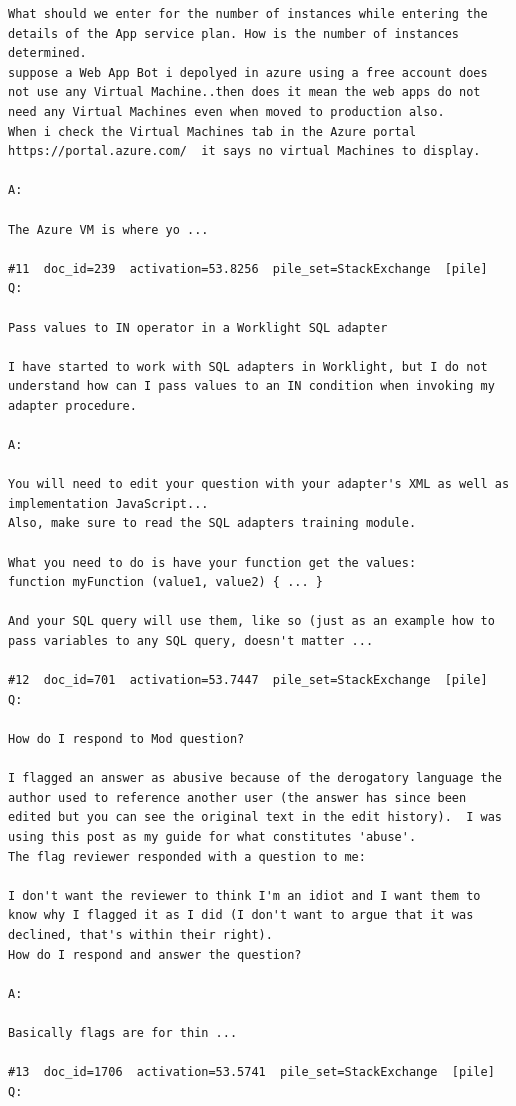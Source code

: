 \begin{verbatim}
What should we enter for the number of instances while entering the details of the App service plan. How is the number of instances determined.
suppose a Web App Bot i depolyed in azure using a free account does not use any Virtual Machine..then does it mean the web apps do not need any Virtual Machines even when moved to production also.
When i check the Virtual Machines tab in the Azure portal https://portal.azure.com/  it says no virtual Machines to display.

A:

The Azure VM is where yo ...

#11  doc_id=239  activation=53.8256  pile_set=StackExchange  [pile]
Q:

Pass values to IN operator in a Worklight SQL adapter

I have started to work with SQL adapters in Worklight, but I do not understand how can I pass values to an IN condition when invoking my adapter procedure.

A:

You will need to edit your question with your adapter's XML as well as implementation JavaScript...
Also, make sure to read the SQL adapters training module.

What you need to do is have your function get the values:
function myFunction (value1, value2) { ... }

And your SQL query will use them, like so (just as an example how to pass variables to any SQL query, doesn't matter ...

#12  doc_id=701  activation=53.7447  pile_set=StackExchange  [pile]
Q:

How do I respond to Mod question?

I flagged an answer as abusive because of the derogatory language the author used to reference another user (the answer has since been edited but you can see the original text in the edit history).  I was using this post as my guide for what constitutes 'abuse'.
The flag reviewer responded with a question to me:

I don't want the reviewer to think I'm an idiot and I want them to know why I flagged it as I did (I don't want to argue that it was declined, that's within their right).
How do I respond and answer the question?

A:

Basically flags are for thin ...

#13  doc_id=1706  activation=53.5741  pile_set=StackExchange  [pile]
Q:


\end{verbatim}
